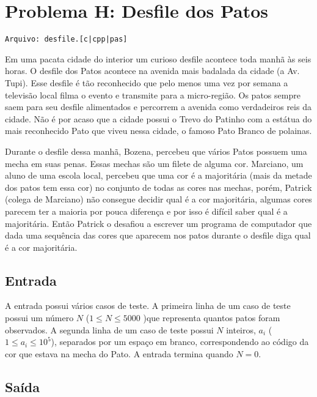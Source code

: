 \section{Problema H: Desfile dos Patos}
\vspace{-0.52cm}
\noindent \begin{verbatim}Arquivo: desfile.[c|cpp|pas]\end{verbatim}

Em uma pacata cidade do interior um curioso desfile acontece toda manhã às seis
horas. O desfile dos Patos acontece na avenida mais badalada da cidade (a Av.
Tupi). Esse desfile é tão reconhecido que pelo menos uma vez por semana
a televisão local filma o evento e transmite para a micro-região. Os patos
sempre saem para seu desfile alimentados e percorrem a avenida como verdadeiros
reis da cidade. Não é por acaso que a cidade possui o Trevo do Patinho com
a estátua do mais reconhecido Pato que viveu nessa cidade, o famoso
Pato Branco de polainas.

Durante o desfile dessa manhã, Bozena, percebeu que vários Patos possuem
uma mecha em suas penas. Essas mechas são um filete de alguma cor. Marciano,
um aluno de uma escola local, percebeu que uma cor é a majoritária (mais da
metade dos patos tem essa cor) no conjunto de todas as cores nas mechas, porém,
Patrick (colega de Marciano) não consegue decidir qual é a cor majoritária,
algumas cores parecem ter a maioria por pouca diferença e por isso é difícil
saber qual é a majoritária. Então Patrick o desafiou a escrever um programa de
computador que dada uma sequência das cores que aparecem nos patos durante o
desfile diga qual é a cor majoritária.

\subsection*{Entrada}

A entrada possui vários casos de teste. A primeira linha de um caso de teste
possui um número $N$ ($1 \leq N \leq 5000$ )que representa quantos patos foram observados. A segunda
linha de um caso de teste possui $N$ inteiros, $a_i$ ( $1 \leq a_i \leq 10^5$),
separados por um espaço em branco, correspondendo ao código da cor que estava
na mecha do Pato. A entrada termina quando $N = 0$.

\subsection*{Saída}

